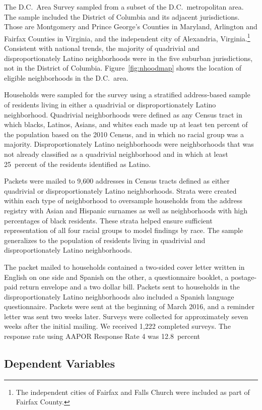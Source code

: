 \documentclass[11pt]{baderart}
\begin{document}
The D.C.\ Area Survey sampled from a subset of the D.C.\ metropolitan area. The sample included the District of Columbia and its adjacent jurisdictions. Those are Montgomery and Prince George's Counties in Maryland, Arlington and Fairfax Counties in Virginia, and the independent city of Alexandria, Virginia.\footnote{The independent cities of Fairfax and Falls Church were included as part of Fairfax County.}  Consistent with national trends, the majority of quadrivial and disproportionately Latino neighborhoods were in the five suburban jurisdictions, not in the District of Columbia. Figure~\ref{fig:nhoodmap} shows the location of eligible neighborhoods in the D.C.\ area. 

Households were sampled for the survey using a stratified address-based sample of residents living in either a quadrivial or disproportionately Latino neighborhood. Quadrivial neighborhoods were defined as any Census tract in which blacks, Latinos, Asians, and whites each made up at least ten percent of the population based on the 2010 Census, and in which no racial group was a majority. Disproportionately Latino neighborhoods were neighborhoods that was not already classified as a quadrivial neighborhood and in which at least 25~percent of the residents identified as Latino.

Packets were mailed to 9,600 addresses in Census tracts defined as either quadrivial or disproportionately Latino neighborhoods. Strata were created within each type of neighborhood to oversample households from the address registry with Asian and Hispanic surnames as well as neighborhoods with high percentages of black residents. These strata helped ensure sufficient representation of all four racial groups to model findings by race. The sample generalizes to the population of residents living in quadrivial and disproportionately Latino neighborhoods. 

The packet mailed to households contained a two-sided cover letter written in English on one side and Spanish on the other, a questionnaire booklet, a postage-paid return envelope and a two dollar bill. Packets sent to households in the disproportionately Latino neighborhoods also included a Spanish language questionnaire. Packets were sent at the beginning of March 2016, and a reminder letter was sent two weeks later. Surveys were collected for approximately seven weeks after the initial mailing. We received 1,222 completed surveys. The response rate using AAPOR Response Rate 4 was 12.8~percent

\subsection{Dependent Variables} 
\end{document}
